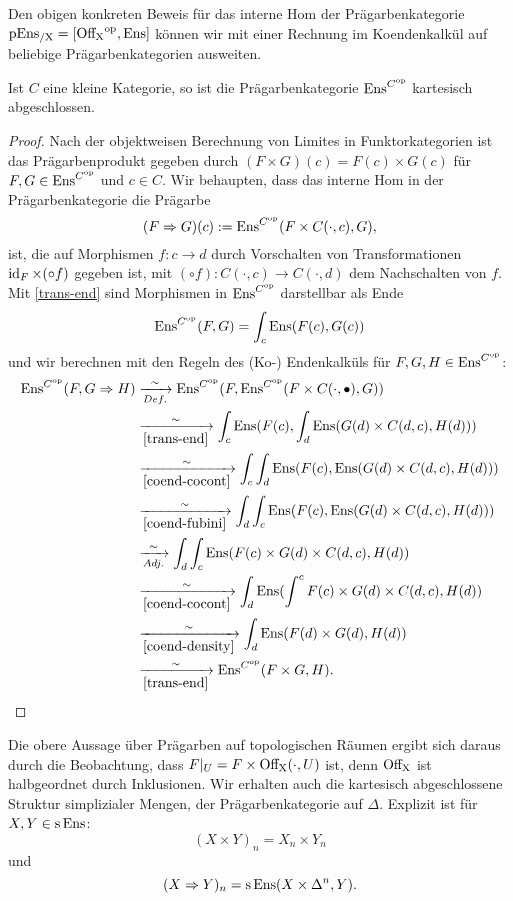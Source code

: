 Den obigen konkreten Beweis für das interne Hom der Prägarbenkategorie
$\operatorname{pEns_{/X}} = [\operatorname{Off_X}^\mathrm{op}, \operatorname{Ens}]$ können wir mit einer Rechnung im
Koendenkalkül auf beliebige Prägarbenkategorien ausweiten.
\begin{prop}
  Ist $C$ eine kleine Kategorie, so ist die Prägarbenkategorie
  $\operatorname{Ens}^{C^\mathrm{op}}$ kartesisch abgeschlossen.
\end{prop}
\begin{proof}
  Nach der objektweisen Berechnung von Limites in Funktorkategorien
  ist das Prägarbenprodukt gegeben durch $(F \times G)(c) = F(c)
  \times G(c)$ für $F, G \in \operatorname{Ens}^{C^\mathrm{op}}$ und $c \in C$. Wir
  behaupten, dass das interne Hom in der Prägarbenkategorie die
  Prägarbe
  \[ (F \Rightarrow G)(c) := \operatorname{Ens}^{C^\mathrm{op}}(F \times C(\cdot, c), G), \]
  ist, die auf Morphismen $f: c \to d$ durch Vorschalten von
  Transformationen $\operatorname{id}_F \times (\circ f)$ gegeben ist, mit $(\circ
  f): C(\cdot, c) \to C(\cdot, d)$ dem Nachschalten von $f$. Mit
  \ref{trans-end} sind Morphismen in $\operatorname{Ens}^{C^\mathrm{op}}$ darstellbar als
  Ende
  \[ \operatorname{Ens}^{C^\mathrm{op}}(F, G) = \int_c \operatorname{Ens}(F(c), G(c)) \]
  und wir berechnen mit den Regeln des (Ko-) Endenkalküls für $F, G, H
  \in \operatorname{Ens}^{C^\mathrm{op}}$:
  \begin{align*}
    \operatorname{Ens}^{C^\mathrm{op}}(F, G \Rightarrow H)
    &\xrightarrow[Def.]{\sim} \operatorname{Ens}^{C^\mathrm{op}}(F, \operatorname{Ens}^{C^\mathrm{op}}(F \times C(\cdot, \bullet), G)) \\
    &\xrightarrow[\ref{trans-end}]{\sim}
     \int_c \operatorname{Ens}(F(c), \int_d \operatorname{Ens}(G(d) \times C(d, c), H(d))) \\
    &\xrightarrow[\ref{coend-cocont}]{\sim}
     \int_c \int_d \operatorname{Ens}(F(c), \operatorname{Ens}(G(d) \times C(d, c), H(d))) \\
    &\xrightarrow[\ref{coend-fubini}]{\sim}
     \int_d \int_c \operatorname{Ens}(F(c), \operatorname{Ens}(G(d) \times  C(d, c), H(d))) \\
    &\xrightarrow[Adj.]{\sim} \int_d \int_c \operatorname{Ens}(F(c) \times G(d) \times C(d, c), H(d)) \\
    &\xrightarrow[\ref{coend-cocont}]{\sim}
     \int_d \operatorname{Ens}( \int^c F(c) \times G(d) \times C(d, c), H(d)) \\
    &\xrightarrow[\ref{coend-density}]{\sim}
     \int_d \operatorname{Ens}( F(d) \times G(d), H(d)) \\
    &\xrightarrow[\ref{trans-end}]{\sim}
     \operatorname{Ens}^{C^\mathrm{op}}(F \times G, H).
  \end{align*}
\end{proof}
Die obere Aussage über Prägarben auf topologischen Räumen ergibt sich
daraus durch die Beobachtung, dass $F|_U = F \times \operatorname{Off_X}(\cdot, U)$
ist, denn $\operatorname{Off_X}$ ist halbgeordnet durch Inklusionen. Wir erhalten
auch die kartesisch abgeschlossene Struktur simplizialer Mengen, der
Prägarbenkategorie auf $\Delta$. Explizit ist für $X, Y \in \operatorname{s}\operatorname{Ens}$:
\[ (X \times Y)_n = X_n \times Y_n \]
und
\[ (X \Rightarrow Y)_n = \operatorname{s}\operatorname{Ens}(X \times \Delta^n, Y). \]

